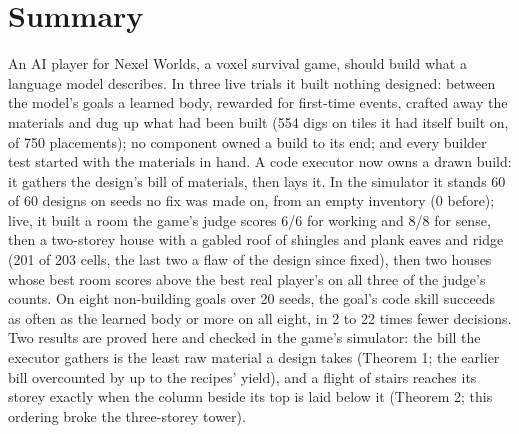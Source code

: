 \section*{Summary}
An AI player for Nexel Worlds, a voxel survival game, should build what a language model describes. In three live
trials it built nothing designed: between the model's goals a learned body, rewarded for first-time events, crafted
away the materials and dug up what had been built (554 digs on tiles it had itself built on, of 750 placements); no
component owned a build to its end; and every builder test started with the materials in hand. A code executor now
owns a drawn build: it gathers the design's bill of materials, then lays it. In the simulator it stands 60 of 60
designs on seeds no fix was made on, from an empty inventory (0 before); live, it built a room the game's judge scores 6/6 for working and 8/8 for sense,
then a two-storey house with a gabled roof of shingles and plank eaves and ridge (201 of 203 cells, the last two a
flaw of the design since fixed), then two houses whose best room scores above the best real player's on all three
of the judge's counts. On eight non-building goals over 20 seeds, the goal's code skill succeeds as often as the
learned body or more on all eight, in 2 to 22 times fewer decisions. Two results are proved here and checked in the
game's simulator: the bill the executor gathers is the least raw material a design takes (Theorem 1; the earlier
bill overcounted by up to the recipes' yield), and a flight of stairs reaches its storey exactly when the column
beside its top is laid below it (Theorem 2; this ordering broke the three-storey tower).

